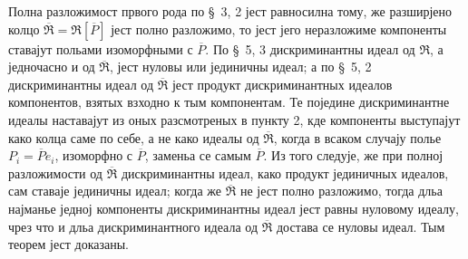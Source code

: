 \documentclass[11pt]{article}
\begin{document}
\setcounter{footnote}{27}

Полна разложимост првого рода по \S~3, 2 јест равносилна тому, же разширјено колцо $\overline{\mathfrak R}=\mathfrak R[\overline P]$ јест полно разложимо, то јест јего неразложиме компоненты ставајут польами изоморфными с $\overline P$. По \S~5, 3 дискриминантны идеал од $\mathfrak R$, а једночасно и од $\overline{\mathfrak R}$, јест нуловы или јединичны идеал; а по \S~5, 2 дискриминантны идеал од $\overline{\mathfrak R}$ јест продукт дискриминантных идеалов компонентов, взятых взходно к тым компонентам. Те поједине дискриминантне идеалы наставајут из оных разсмотреных в пункту 2, кде компоненты выступајут како колца саме по себе, а не како идеалы од $\overline{\mathfrak R}$, когда в всаком случају полье $P_i=\overline P e_i$, изоморфно с $\overline P$, заменьа се самым $\overline P$. Из того следује, же при полној разложимости од $\overline{\mathfrak R}$ дискриминантны идеал, како продукт јединичных идеалов, сам ставаје јединичны идеал; когда же $\overline{\mathfrak R}$ не јест полно разложимо, тогда дльа најманье једној компоненты дискриминантны идеал јест равны нуловому идеалу, чрез что и дльа дискриминантного идеала од $\overline{\mathfrak R}$ достава се нуловы идеал. Тым теорем јест доказаны.
\end{document}
